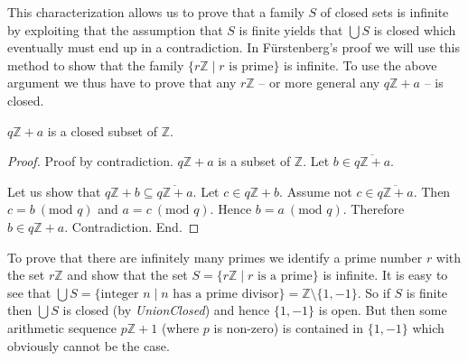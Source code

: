 \documentclass{article}
\renewcommand{\mod}{\text{mod }}
\newcommand{\Int}{\mathbb{Z}}
\begin{document}
This characterization allows us to prove that a family $S$ of closed sets is infinite by exploiting that the assumption that $S$ is finite yields that $\bigcup S$ is closed which eventually must end up in a contradiction. In Fürstenberg's proof we will use this method to show that the family $\{ r \Int \mid r \text{ is prime} \}$ is infinite. To use the above argument we thus have to prove that any $r \Int$ -- or more general any $q \Int + a$ -- is closed.

  \begin{forthel}
    \begin{lemma}[ArSeqClosed]
      $q \Int + a$ is a closed subset of $\Int$.
    \end{lemma}
    \begin{proof}
      Proof by contradiction. $q \Int + a$ is a subset of $\Int$. Let $b \in \overline{q \Int + a}$.

      Let us show that $q \Int + b \subseteq \overline{q \Int + a}$.
        Let $c \in q \Int + b$. Assume not $c \in \overline{q \Int + a}$. Then $c = b ~(\mod q)$ and $a = c ~(\mod q)$. Hence $b = a ~(\mod q)$. Therefore $b \in q \Int + a$. Contradiction.
      End.
    \end{proof}
  \end{forthel}

  To prove that there are infinitely many primes we identify a prime number $r$ with the set $r \Int$ and show that the set $S = \{r \Int \mid r \textrm{ is a prime} \}$ is infinite. It is easy to see that $\bigcup S = \{ \text{integer } n \mid n \text{ has a prime divisor} \} = \Int \setminus \{ 1, -1 \}$. So if $S$ is finite then $\bigcup S$ is closed (by \textit{UnionClosed}) and hence $\{ 1, -1 \}$ is open. But then some arithmetic sequence $p \Int + 1$ (where $p$ is non-zero) is contained in $\{ 1, -1 \}$ which obviously cannot be the case.
\end{document}
